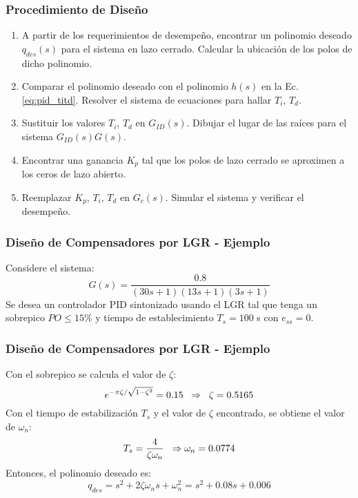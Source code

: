 \documentclass[aspectratio=169,handout]{beamer}
\theoremstyle{definition}
\theoremstyle{plain}
\theoremstyle{remark}
\begin{document}
\begin{frame}[c]\frametitle{Procedimiento de Diseño}
	\begin{enumerate}
		\item A partir de los requerimientos de desempeño, encontrar un polinomio deseado $q_{des}(s)$ para el sistema en lazo cerrado. Calcular la ubicación de los polos de dicho polinomio.
		\item Comparar el polinomio deseado con el polinomio $h(s)$ en la Ec.\eqref{eq:pid_titd}. Resolver el sistema de ecuaciones para hallar $T_i$, $T_d$.
		\item Sustituir los valores $T_i$, $T_d$ en $G_{ID}(s)$. Dibujar el lugar de las raíces para el sistema $G_{ID}(s)G(s)$.
		\item Encontrar una ganancia $K_p$ tal que los polos de lazo cerrado se aproximen a los ceros de lazo abierto.
		\item Reemplazar $K_p$, $T_i$, $T_d$ en $G_c(s)$. Simular el sistema y verificar el desempeño.
	\end{enumerate}
\end{frame}

\begin{frame}[c]\frametitle{Diseño de Compensadores por LGR - Ejemplo}
	Considere el sistema:
	\begin{equation*}
		G(s) = \frac{0.8}{(30s+1)(13s+1)(3s+1)}
	\end{equation*}
	Se desea un controlador PID sintonizado usando el LGR tal que tenga un sobrepico $PO \leq 15\%$ y tiempo de establecimiento $T_s = 100$ s con $e_{ss} = 0$. 
\end{frame}

\begin{frame}[c]\frametitle{Diseño de Compensadores por LGR - Ejemplo}
	Con el sobrepico se calcula el valor de $\zeta$:
	\begin{equation*}
		e^{-\pi \zeta/\sqrt{1-\zeta^2}} = 0.15 \hspace*{2mm} \Rightarrow \hspace*{2mm} \zeta = 0.5165
	\end{equation*}
	Con el tiempo de estabilización $T_s$ y el valor de $\zeta$ encontrado, se obtiene el valor de $\omega_n$:
	\begin{align*}
		T_s = \frac{4}{\zeta \omega_n} \hspace*{2mm} \Rightarrow \vspace*{2mm} \omega_n = 0.0774
	\end{align*}
	Entonces, el polinomio deseado es:
	\begin{equation*}
		q_{des} = s^2 + 2\zeta\omega_n s + \omega_n^2 = s^2 + 0.08 s + 0.006
	\end{equation*}
\end{frame}
\end{document}
